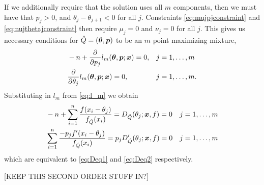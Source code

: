 	If we additionally require that the solution uses all $m$ components, then we must have that $p_j > 0$, and $\theta_j - \theta_{j+1} < 0$ for all $j$. Constraints \eqref{eq:mujpjconstraint} and \eqref{eq:nujthetajconstraint} then require $\mu_j = 0$ and $\nu_j = 0$ for all $j$. This gives us necessary conditions for $\hat{Q} = ({\bm{{\theta}}}, {\bm{{p}}})$ to be an $m$ point maximizing mixture,
	\begin{align}
		&-n + \frac{\partial}{\partial p_j} l_m({\bm{{\theta}}},{\bm{{p}}};{\bm{{x}}}) = 0, && j = 1,\dots,m\\
		&\frac{\partial}{\partial \theta_j} l_m({\bm{{\theta}}},{\bm{{p}}};{\bm{{x}}}) = 0, && j = 1,\dots, m.
	\end{align}
	Substituting in $l_m$ from \eqref{eq:l_m} we obtain
	\begin{align}
		&-n + \sum_{i=1}^n \frac{f(x_i - \theta_j)}{f_{\hat{Q}}(x_i)} = D_{\hat{Q}}(\theta_j;{\bm{{x}}}, f) =  0 && j = 1, \dots, m\\
		&\sum_{i=1}^n \frac{-p_jf'(x_i - \theta_j)}{f_{\hat{Q}}(x_i)} = p_j D_{\hat{Q}}'(\theta_j;{\bm{{x}}}, f) = 0 && j = 1, \dots, m
	\end{align}
	which are equivalent to \eqref{eq:Deq1} and \eqref{eq:Deq2} respectively.

	[KEEP THIS SECOND ORDER STUFF IN?]

